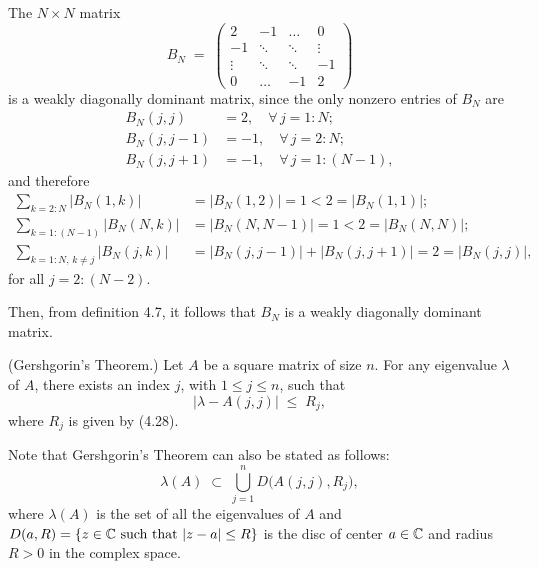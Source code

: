 \begin{examplex}
The $N \times N$ matrix
\[
B_N \;=\; \begin{pmatrix}
2 & -1 & \dots & 0\\
-1 & \ddots & \ddots & \vdots\\
\vdots & \ddots & \ddots & -1\\
0 & \dots & -1 & 2
\end{pmatrix}
\]
is a weakly diagonally dominant matrix, since the only nonzero entries of $B_N$ are
\begin{align*}
B_N(j,j) &= 2, \quad \forall\, j = 1:N;\\
B_N(j,j-1) &= -1, \quad \forall\, j = 2:N;\\
B_N(j,j+1) &= -1, \quad \forall\, j = 1:(N-1),
\end{align*}
and therefore
\begin{align*}
\sum_{k=2:N} |B_N(1,k)| &= |B_N(1,2)| = 1 < 2 = |B_N(1,1)|;\\
\sum_{k=1:(N-1)} |B_N(N,k)| &= |B_N(N,N-1)| = 1 < 2 = |B_N(N,N)|;\\
\sum_{k=1:N,\, k \neq j} |B_N(j,k)| &= |B_N(j,j-1)| + |B_N(j,j+1)| = 2 = |B_N(j,j)|,
\end{align*}
for all $j = 2:(N-2)$.

Then, from definition 4.7, it follows that $B_N$ is a weakly diagonally dominant
matrix.
\end{examplex}

\begin{theorem}
(Gershgorin's Theorem.) Let $A$ be a square matrix of size $n$. For any eigenvalue
$\lambda$ of $A$, there
exists an index $j$, with $1 \leq j \leq n$, such that
\begin{equation}
|\lambda - A(j,j)| \;\leq\; R_j,
\end{equation}
where $R_j$ is given by (4.28).
\end{theorem}

Note that Gershgorin's Theorem can also be stated as follows:
\[
\lambda(A) \;\subset\; \bigcup_{j=1}^n D\bigl(A(j,j), R_j\bigr),
\]
where $\lambda(A)$ is the set of all the eigenvalues of $A$ and $D(a,R) = \{z \in \mathbb{C}
\ \text{such that} \ |z-a| \leq R\}$ is the disc of center $a \in \mathbb{C}$ and radius
$R > 0$ in the complex space.

